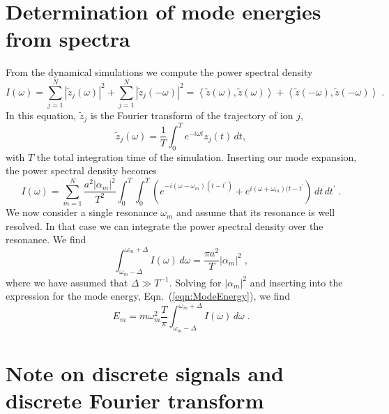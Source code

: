 \documentclass[aps, pra, preprint]{revtex4-1}
\begin{document}
\section{Determination of mode energies from spectra}

From the dynamical simulations we compute the power spectral
density
\begin{equation}
  I(\omega) =
    \sum_{j=1}^N\left| \tilde{z}_j(\omega) \right|^2 +
    \sum_{j=1}^N\left| \tilde{z}_j(-\omega) \right|^2 =
    \left\langle \tilde{z}(\omega), \tilde{z}(\omega)\right \rangle +
    \left\langle \tilde{z}(-\omega), \tilde{z}(-\omega)\right \rangle 
    \;.\label{eqn:psd}
\end{equation}
In this equation, $\tilde{z}_j$ is the Fourier transform of the
trajectory of ion $j$,
\begin{equation}
  \tilde{z}_j(\omega) = \frac{1}{T}\int_0^T e^{-i\omega t}z_j(t)\, dt,
\end{equation}
with $T$ the total integration time of the simulation. Inserting
our mode expansion, the power spectral density becomes
\begin{equation}
  I(\omega) =
  \sum_{m=1}^N\frac{a^2 \left| \alpha_m \right|^2}{T^2}
  \int_0^T\int_0^T\left( e^{-i(\omega-\omega_m)(t-t^\prime)} +
    e^{i(\omega+\omega_m)(t-t^\prime} \right)\,dt\,dt^\prime\;.
\end{equation}
We now consider a single resonance $\omega_m$ and assume that
its resonance is well resolved. In that case we can integrate the
power spectral density over the resonance. We find
\begin{equation}
  \int_{\omega_m-\Delta}^{\omega_m+\Delta} I(\omega)\,d\omega =
  \frac{\pi a^2}{T}\left| \alpha_m \right|^2\;,
\end{equation}
where we have assumed that $\Delta\gg T^{-1}$. Solving for
$|\alpha_m|^2$ and inserting into the expression for the mode
energy, Eqn.~(\ref{eqn:ModeEnergy}), we find
\begin{equation}
  E_m = m\omega_m^2\frac{T}{\pi}
        \int_{\omega_m-\Delta}^{\omega_m+\Delta}I(\omega)\,d\omega\;.
  \label{eqn:ModeEnergyFromSpectrum}
\end{equation} 


\section{Note on discrete signals and discrete Fourier transform}
\end{document}
